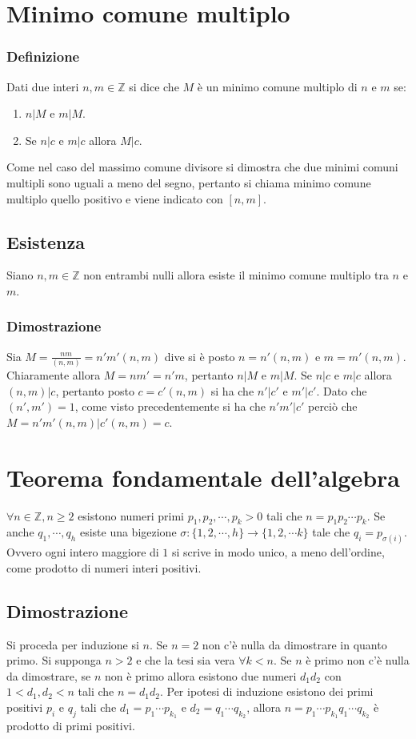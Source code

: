 \section{Minimo comune multiplo}
\subsubsection{Definizione}
Dati due interi $n,m\in\mathbb{Z}$ si dice che $M$ \`e un minimo comune multiplo di $n$ e $m$ se:
\begin{enumerate}
\item $n|M$ e $m|M$.
\item Se $n|c$ e $m|c$ allora $M|c$.
\end{enumerate}
Come nel caso del massimo comune divisore si dimostra che due minimi comuni multipli sono uguali a meno del segno, pertanto si chiama minimo comune multiplo quello positivo e viene indicato con $[n,m]$.
\subsection{Esistenza}
Siano $n,m\in\mathbb{Z}$ non entrambi nulli allora esiste il minimo comune multiplo tra $n$ e $m$.
\subsubsection{Dimostrazione}
Sia $M=\frac{nm}{(n,m)}=n'm'(n,m)$ dive si \`e posto $n=n'(n,m)$ e $m=m'(n,m)$. Chiaramente allora $M=nm'=n'm$, pertanto $n|M$ e $m|M$. Se $n|c$ e $m|c$ allora $(n,m)|c$, pertanto posto 
$c=c'(n,m)$ si ha che $n'|c'$ e $m'|c'$. Dato che $(n',m')=1$, come visto precedentemente si ha che $n'm'|c'$ perci\`o che $M=n'm'(n,m)|c'(n,m)=c$.
\section{Teorema fondamentale dell'algebra}
$\forall n\in\mathbb{Z}, n\ge 2$ esistono numeri primi $p_1,p_2,\cdots, p_k>0$ tali che $n=p_1p_2\cdots p_k$. Se anche $q_1,\cdots, q_h$ esiste una bigezione $\sigma:\{1,2,\cdots,h\}\rightarrow\{1,2,
\cdots k\}$ tale che $q_i=p_{\sigma(i)}$. Ovvero ogni intero maggiore di $1$ si scrive in modo unico, a meno dell'ordine, come prodotto di numeri interi positivi.
\subsection{Dimostrazione}
Si proceda per induzione si $n$. Se $n=2$ non c'\`e nulla da dimostrare in quanto primo. Si supponga $n>2$ e che la tesi sia vera $\forall k<n$. Se $n$ \`e primo non c'\`e nulla da dimostrare, se $n$ non \`e 
primo allora esistono due numeri $d_1d_2$ con $1<d_1,d_2<n$ tali che $n=d_1d_2$. Per ipotesi di induzione esistono dei primi positivi $p_i$ e $q_j$ tali che $d_1=p_1\cdots p_{k_1}$ e $d_2=q_1\cdots 
q_{k_2}$, allora $n=p_1\cdots p_{k_1}q_1\cdots q_{k_2}$ \`e prodotto di primi positivi.
